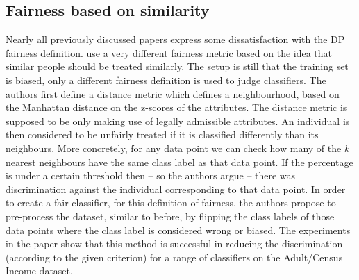 
\subsection{Fairness based on similarity}%
\label{fairness-based-on-similarity}
Nearly all previously discussed papers express some dissatisfaction
with the \acf{DP} fairness definition.
\citet{luong2011k} use a very different fairness metric
based on the idea that similar people should be treated similarly.
The setup is still that the training set is biased,
only a different fairness definition is used to judge classifiers.
The authors first define a distance metric which defines a neighbourhood,
based on the Manhattan distance on the z-scores of the attributes.
The distance metric is supposed to be only making use of legally admissible attributes.
An individual is then considered to be unfairly treated
if it is classified differently than its neighbours.
More concretely, for any data point we can check
how many of the \(k\) nearest neighbours have the same class label as that data point.
If the percentage is under a certain threshold
then -- so the authors argue -- there was discrimination against the individual corresponding to that data point.
In order to create a fair classifier, for this definition of fairness,
the authors propose to pre-process the dataset,
similar to \citet{kamiran2009classifying} before,
by flipping the class labels of those data points where the class label is considered wrong or biased.
The experiments in the paper show that this method is successful in reducing the discrimination
(according to the given criterion)
for a range of classifiers on the Adult/Census Income dataset.

